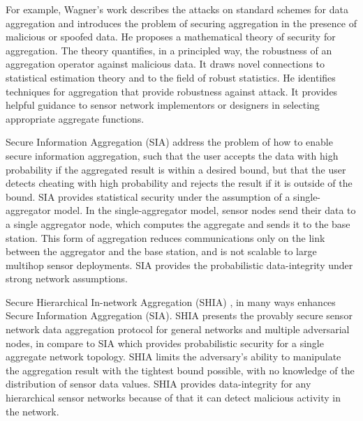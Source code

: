 	For example, Wagner's work \cite{wagner2004resilient} describes the attacks on standard schemes for data aggregation and introduces the problem of securing aggregation in the presence of malicious or spoofed data.
	He proposes a mathematical theory of security for aggregation.
	The theory quantifies, in a principled way, the robustness of an aggregation operator against malicious data.
	It draws novel connections to statistical estimation theory and to the field of robust statistics.
	He identifies techniques for aggregation that provide robustness against attack. 
	It provides helpful guidance to sensor network implementors or designers in selecting appropriate aggregate functions.

	Secure Information Aggregation (SIA) \cite{przydatek2003sia}  address the problem of how to enable secure information aggregation, such that the user accepts the data with high probability if the aggregated result is within a desired bound, but that the user detects cheating with high probability and rejects the result if it is outside of the bound.
	SIA provides statistical security under the assumption of a single-aggregator model.
	In the single-aggregator model, sensor nodes send their data to a single
	aggregator node, which computes the aggregate and sends it to the
	base station.
	This form of aggregation reduces communications only on the link between the aggregator and the base station, and is not scalable to large multihop sensor deployments.
	SIA provides the probabilistic data-integrity under strong network assumptions.

	Secure Hierarchical In-network Aggregation (SHIA) \cite{chan2006secure}, in many ways enhances Secure Information Aggregation (SIA).
	SHIA presents the provably secure sensor network data aggregation protocol for general networks and multiple adversarial nodes, in compare to SIA which provides probabilistic security for a single aggregate network topology.
	SHIA limits the adversary’s ability to manipulate the aggregation result with the tightest bound possible, with no knowledge of the distribution of sensor data values.
	SHIA provides data-integrity for any hierarchical sensor networks because of that it can detect malicious activity in the network.

